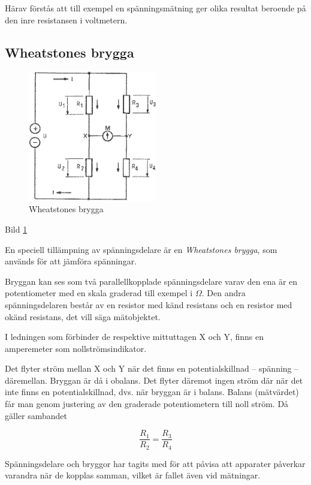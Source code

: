 Härav förstås att till exempel en spänningsmätning ger olika resultat beroende på den
inre resistansen i voltmetern.

\subsection{Wheatstones brygga}

\begin{figure}
\includegraphics[width=0.5\textwidth]{images/cropped_pdfs/bild_2_3-04.pdf}
\caption{Wheatstones brygga}
\label{fig:BildII3-04}
\end{figure}

Bild \ref{fig:BildII3-04}

En speciell tillämpning av spänningsdelare är en \emph{Wheatstones brygga},
som används för att jämföra spänningar.

Bryggan kan ses som två parallellkopplade spänningsdelare varav den ena är en
potentiometer med en skala graderad till exempel i \(\Omega\).
Den andra spänningsdelaren består av en resistor med känd resistans och en
resistor med okänd resistans, det vill säga mätobjektet.

I ledningen som förbinder de respektive mittuttagen X och Y, finns en
amperemeter som nollströmsindikator.

Det flyter ström mellan X och Y när det finns en potentialskillnad -- spänning
-- däremellan.
Bryggan är då i obalans.
Det flyter däremot ingen ström där när det inte finns en potentialskillnad,
dvs. när bryggan är i balans.
Balans (mätvärdet) får man genom justering av den graderade potentiometern
till noll ström.
Då gäller sambandet

\[\frac{R_1}{R_2} = \frac{R_3}{R_4}\]

Spänningsdelare och bryggor har tagits med för att påvisa att apparater påverkar
varandra när de kopplas samman, vilket är fallet även vid mätningar.

